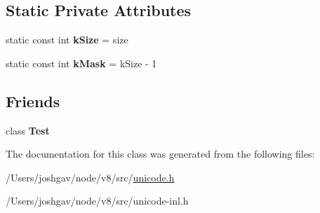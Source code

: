 \subsection*{Static Private Attributes}
\begin{DoxyCompactItemize}
\item 
static const int {\bfseries k\+Size} = size\hypertarget{classunibrow_1_1_predicate_afcfce823a759d93ce1e1785befe7cc87}{}\label{classunibrow_1_1_predicate_afcfce823a759d93ce1e1785befe7cc87}

\item 
static const int {\bfseries k\+Mask} = k\+Size -\/ 1\hypertarget{classunibrow_1_1_predicate_ad1201381814df27d18181229572e7002}{}\label{classunibrow_1_1_predicate_ad1201381814df27d18181229572e7002}

\end{DoxyCompactItemize}
\subsection*{Friends}
\begin{DoxyCompactItemize}
\item 
class {\bfseries Test}\hypertarget{classunibrow_1_1_predicate_a5b78b1c2e1fa07ffed92da365593eaa4}{}\label{classunibrow_1_1_predicate_a5b78b1c2e1fa07ffed92da365593eaa4}

\end{DoxyCompactItemize}


The documentation for this class was generated from the following files\+:\begin{DoxyCompactItemize}
\item 
/\+Users/joshgav/node/v8/src/\hyperlink{unicode_8h}{unicode.\+h}\item 
/\+Users/joshgav/node/v8/src/unicode-\/inl.\+h\end{DoxyCompactItemize}
